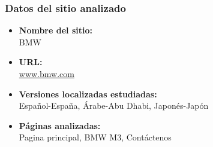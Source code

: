 \documentclass[a4paper,11pt]{article}
\begin{document}
\subsubsection{Datos del sitio analizado}
\begin{itemize}
\item \textbf{Nombre del sitio:}\\
BMW
\item \textbf{URL:}\\
\url{www.bmw.com}
\item \textbf{Versiones localizadas estudiadas:}\\
Español-España, Árabe-Abu Dhabi, Japonés-Japón
\item \textbf{Páginas analizadas:}\\
Pagina principal, BMW M3, Contáctenos
\end{itemize}
\end{document}
